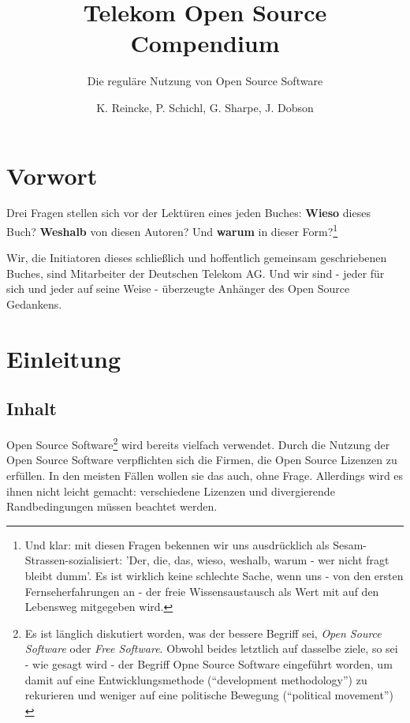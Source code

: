 \documentclass[DIV=calc,BCOR=5mm,11pt,headings=small,oneside,toc=bib]{scrbook}
\begin{document}
\nocite{*}

\titlehead{Open Source Software in großen Firmen wie die Deutschen Telekom AG}
\subject{Lizenz- und Patentprobleme im \itshape{Aufriss}}
\title{Telekom Open Source Compendium}
\subtitle{Die reguläre Nutzung von Open Source Software}
\author{
  K. Reincke,
  P. Schichl, 
  G. Sharpe, 
  J. Dobson
}

\maketitle

\footnotesize
\tableofcontents
\newpage

\normalsize

\chapter{Vorwort}
Drei Fragen stellen sich vor der Lektüren eines jeden Buches: {\bfseries Wieso}
dieses Buch? {\bfseries Weshalb} von diesen Autoren? Und {\bfseries warum} in
dieser Form?\footnote{Und klar: mit diesen Fragen bekennen wir uns ausdrücklich als Sesam-Strassen-sozialisiert:
'Der, die, das, wieso, weshalb, warum - wer nicht fragt bleibt dumm'. Es ist
wirklich keine schlechte Sache, wenn uns - von den ersten Fernseherfahrungen an
- der freie Wissensaustausch als Wert mit auf den Lebensweg mitgegeben wird.}
 
Wir, die Initiatoren dieses schließlich und hoffentlich gemeinsam
geschriebenen Buches, sind Mitarbeiter der Deutschen Telekom AG. Und wir sind - jeder für sich
und jeder auf seine Weise - überzeugte Anhänger des Open Source Gedankens.
\chapter{Einleitung}
\section{Inhalt}
Open Source Software\footnote{Es ist länglich diskutiert worden, was der bessere
Begriff sei, {\itshape Open Source Software} oder {\itshape Free Software}.
Obwohl beides letztlich auf dasselbe ziele, so sei - wie gesagt wird - der
Begriff Opne Source Software eingeführt worden, um damit auf eine
Entwicklungsmethode (``development methodology'') zu rekurieren und weniger auf
eine politische Bewegung (``political movement'') \cite[vgl. dazu] [S.232]
{Fogel2006a} } wird bereits vielfach verwendet. Durch die Nutzung der Open Source
Software verpflichten sich die Firmen, die Open Source Lizenzen zu erfüllen. In
den meisten Fällen wollen sie das auch, ohne Frage. Allerdings wird es ihnen
nicht leicht gemacht: verschiedene Lizenzen und divergierende Randbedingungen
müssen beachtet werden. 
\end{document}
